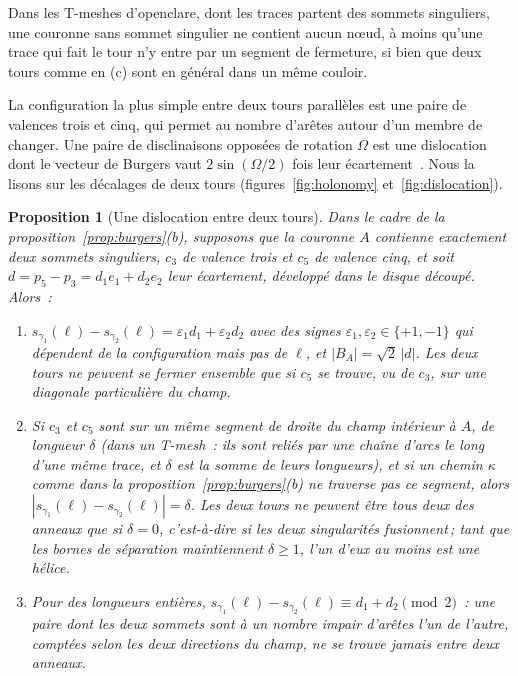 \documentclass[11pt,a4paper]{article}
\newtheorem{proposition}{Proposition}
\newcommand{\shift}{s}
\begin{document}
Dans les T-meshes d'openclare, dont les traces partent des sommets
singuliers, une couronne sans sommet singulier ne contient aucun nœud, à moins
qu'une trace qui fait le tour n'y entre par un segment de fermeture, si bien
que deux tours comme en (c) sont en général dans un même couloir.

La configuration la plus simple entre deux tours parallèles est une paire de
valences trois et cinq, qui permet au nombre d'arêtes autour d'un membre de
changer. Une paire de disclinaisons opposées de rotation $\Omega$ est une
dislocation dont le vecteur de Burgers vaut $2\sin(\Omega/2)$ fois leur
écartement~\cite[éq.~(5)]{kleman2008disclinations}. Nous la lisons sur les
décalages de deux tours (figures~\ref{fig:holonomy}
et~\ref{fig:dislocation}).

\begin{proposition}[Une dislocation entre deux tours]\label{prop:dislocation}
Dans le cadre de la proposition~\ref{prop:burgers}(b), supposons que la
couronne $A$ contienne exactement deux sommets singuliers, $c_3$ de valence
trois et $c_5$ de valence cinq, et soit $d = p_5 - p_3 = d_1 e_1 + d_2 e_2$
leur écartement, développé dans le disque découpé. Alors~:
\begin{enumerate}
\item[(i)] $\shift_{\gamma_1}(\ell) - \shift_{\gamma_2}(\ell) = \varepsilon_1
  d_1 + \varepsilon_2 d_2$ avec des signes $\varepsilon_1, \varepsilon_2 \in
  \{+1, -1\}$ qui dépendent de la configuration mais pas de $\ell$, et $|B_A|
  = \sqrt2\,|d|$. Les deux tours ne peuvent se fermer ensemble que si $c_5$
  se trouve, vu de $c_3$, sur une diagonale particulière du champ.
\item[(ii)] Si $c_3$ et $c_5$ sont sur un même segment de droite du champ
  intérieur à $A$, de longueur $\delta$ (dans un T-mesh~: ils sont reliés par
  une chaîne d'arcs le long d'une même trace, et $\delta$ est la somme de
  leurs longueurs), et si un chemin $\kappa$ comme dans la
  proposition~\ref{prop:burgers}(b) ne traverse pas ce segment, alors
  $|\shift_{\gamma_1}(\ell) - \shift_{\gamma_2}(\ell)| = \delta$. Les deux
  tours ne peuvent être tous deux des anneaux que si $\delta = 0$,
  c'est-à-dire si les deux singularités fusionnent\,; tant que les bornes de
  séparation maintiennent $\delta \ge 1$, l'un d'eux au moins est une hélice.
\item[(iii)] Pour des longueurs entières, $\shift_{\gamma_1}(\ell) -
  \shift_{\gamma_2}(\ell) \equiv d_1 + d_2 \pmod 2$~: une paire dont les deux
  sommets sont à un nombre impair d'arêtes l'un de l'autre, comptées selon les
  deux directions du champ, ne se trouve jamais entre deux anneaux.
\end{enumerate}
\end{proposition}
\end{document}
